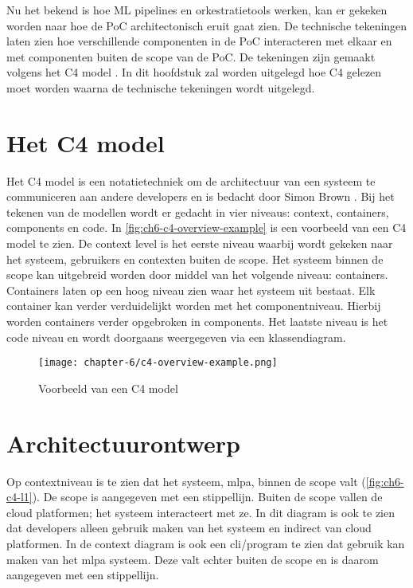 Nu het bekend is hoe ML pipelines en orkestratietools werken, kan er gekeken worden naar hoe de PoC architectonisch eruit gaat zien. De technische tekeningen laten zien hoe verschillende componenten in de PoC interacteren met elkaar en met componenten buiten de scope van de PoC. De tekeningen zijn gemaakt volgens het C4 model \cite{c4-model}. In dit hoofdstuk zal worden uitgelegd hoe C4 gelezen moet worden waarna de technische tekeningen wordt uitgelegd.

\section{Het C4 model}\label{sec:ch6-het-c4-model}
Het C4 model is een notatietechniek om de architectuur van een systeem te communiceren aan andere developers en is bedacht door Simon Brown \cite{c4-model}. Bij het tekenen van de modellen wordt er gedacht in vier niveaus: context, containers, components en code. In \autoref{fig:ch6-c4-overview-example} is een voorbeeld van een C4 model te zien. De context level is het eerste niveau waarbij wordt gekeken naar het systeem, gebruikers en contexten buiten de scope. Het systeem binnen de scope kan uitgebreid worden door middel van het volgende niveau: containers. Containers laten op een hoog niveau zien waar het systeem uit bestaat. Elk container kan verder verduidelijkt worden met het componentniveau. Hierbij worden containers verder opgebroken in components. Het laatste niveau is het code niveau en wordt doorgaans weergegeven via een klassendiagram. 

\begin{figure}[hbt!]
  \centering
  \texttt{[image: chapter-6/c4-overview-example.png]}
  \caption{Voorbeeld van een C4 model \cite{c4-model}}
  \label{fig:ch6-c4-overview-example}
\end{figure}

\newpage

\section{Architectuurontwerp}\label{sec:ch6-architectuurontwerp}
Op contextniveau is te zien dat het systeem, \acrfull{mlpa}, binnen de scope valt (\autoref{fig:ch6-c4-l1}). De scope is aangegeven met een stippellijn. Buiten de scope vallen de cloud platformen; het systeem interacteert met ze. In dit diagram is ook te zien dat developers alleen gebruik maken van het systeem en indirect van cloud platformen. In de context diagram is ook een \acrfull{cli}/program te zien dat gebruik kan maken van het \acrshort{mlpa} systeem. Deze valt echter buiten de scope en is daarom aangegeven met een stippellijn.

